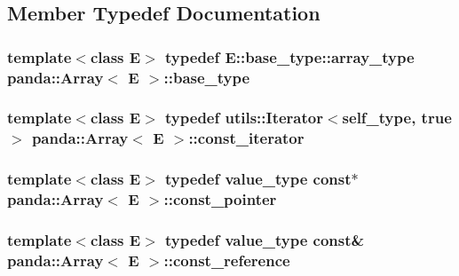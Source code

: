\subsection{Member Typedef Documentation}
\hypertarget{classpanda_1_1Array_a3716c2dd4b92529bd7a9e8c94419e52d}{
\subsubsection[{base\_\-type}]{\setlength{\rightskip}{0pt plus 5cm}template$<$class E$>$ typedef E::base\_\-type::array\_\-type {\bf panda::Array}$<$ E $>$::{\bf base\_\-type}}}
\label{classpanda_1_1Array_a3716c2dd4b92529bd7a9e8c94419e52d}
\hypertarget{classpanda_1_1Array_a4c0be76e73e13139fc0c132922f31323}{
\subsubsection[{const\_\-iterator}]{\setlength{\rightskip}{0pt plus 5cm}template$<$class E$>$ typedef {\bf utils::Iterator}$<${\bf self\_\-type}, true$>$ {\bf panda::Array}$<$ E $>$::{\bf const\_\-iterator}}}
\label{classpanda_1_1Array_a4c0be76e73e13139fc0c132922f31323}
\hypertarget{classpanda_1_1Array_a3c3336e22b822441b731c248b272e8bb}{
\subsubsection[{const\_\-pointer}]{\setlength{\rightskip}{0pt plus 5cm}template$<$class E$>$ typedef {\bf value\_\-type} const$\ast$ {\bf panda::Array}$<$ E $>$::{\bf const\_\-pointer}}}
\label{classpanda_1_1Array_a3c3336e22b822441b731c248b272e8bb}
\hypertarget{classpanda_1_1Array_a64dff4ee5d35a16425535f06c3e2b3e2}{
\subsubsection[{const\_\-reference}]{\setlength{\rightskip}{0pt plus 5cm}template$<$class E$>$ typedef {\bf value\_\-type} const\& {\bf panda::Array}$<$ E $>$::{\bf const\_\-reference}}}
